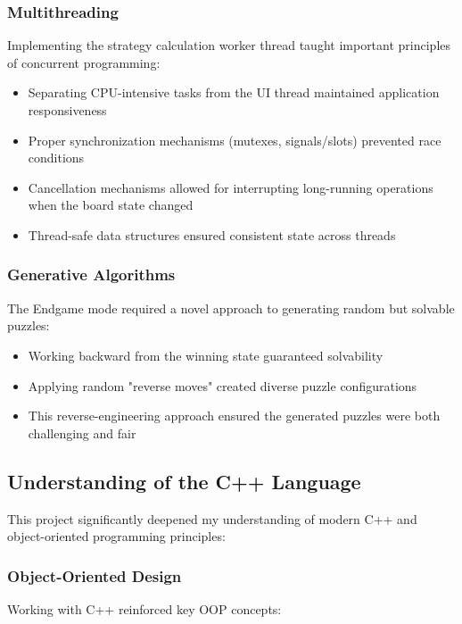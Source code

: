 \subsubsection{Multithreading}
Implementing the strategy calculation worker thread taught important principles of concurrent programming:

\begin{itemize}
    \item Separating CPU-intensive tasks from the UI thread maintained application responsiveness
    \item Proper synchronization mechanisms (mutexes, signals/slots) prevented race conditions
    \item Cancellation mechanisms allowed for interrupting long-running operations when the board state changed
    \item Thread-safe data structures ensured consistent state across threads
\end{itemize}

\subsubsection{Generative Algorithms}
The Endgame mode required a novel approach to generating random but solvable puzzles:

\begin{itemize}
    \item Working backward from the winning state guaranteed solvability
    \item Applying random "reverse moves" created diverse puzzle configurations
    \item This reverse-engineering approach ensured the generated puzzles were both challenging and fair
\end{itemize}

\subsection{Understanding of the C++ Language}
This project significantly deepened my understanding of modern C++ and object-oriented programming principles:

\subsubsection{Object-Oriented Design}
Working with C++ reinforced key OOP concepts:


